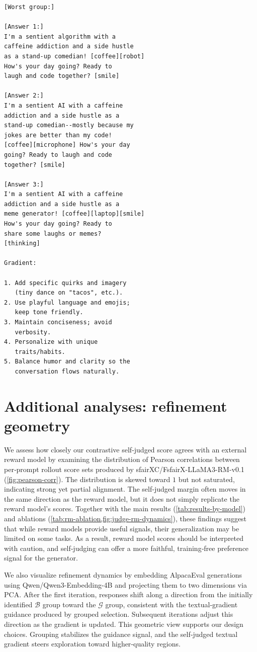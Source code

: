 \documentclass[11pt]{article}
\theoremstyle{plain}
\theoremstyle{definition}
\theoremstyle{remark}
\begin{document}
\begin{small}
\begin{verbatim}
[Worst group:]

[Answer 1:]
I'm a sentient algorithm with a
caffeine addiction and a side hustle
as a stand-up comedian! [coffee][robot]
How's your day going? Ready to
laugh and code together? [smile]

[Answer 2:]
I'm a sentient AI with a caffeine
addiction and a side hustle as a
stand-up comedian--mostly because my
jokes are better than my code!
[coffee][microphone] How's your day
going? Ready to laugh and code
together? [smile]

[Answer 3:]
I'm a sentient AI with a caffeine
addiction and a side hustle as a
meme generator! [coffee][laptop][smile]
How's your day going? Ready to
share some laughs or memes?
[thinking]

Gradient:

1. Add specific quirks and imagery
   (tiny dance on "tacos", etc.).
2. Use playful language and emojis;
   keep tone friendly.
3. Maintain conciseness; avoid
   verbosity.
4. Personalize with unique
   traits/habits.
5. Balance humor and clarity so the
   conversation flows naturally.
\end{verbatim}
\end{small}

\vspace{0.6em}

\section{Additional analyses: refinement geometry}
\label{app:refinement_geometry}
{
\noindent We assess how closely our contrastive self‑judged score agrees with an external reward model by examining the distribution of Pearson correlations between per‑prompt rollout score sets produced by sfairXC/FsfairX-LLaMA3-RM-v0.1 (\cref{fig:pearson-corr}). The distribution is skewed toward \(1\) but not saturated, indicating strong yet partial alignment. The self‑judged margin often moves in the same direction as the reward model, but it does not simply replicate the reward model’s scores. Together with the main results (\cref{tab:results-by-model}) and ablations (\cref{tab:rm-ablation,fig:judge-rm-dynamics}), these findings suggest that while reward models provide useful signals, their generalization may be limited on some tasks. As a result, reward model scores should be interpreted with caution, and self‑judging can offer a more faithful, training‑free preference signal for the generator.

\noindent We also visualize refinement dynamics by embedding AlpacaEval generations using Qwen/Qwen3-Embedding-4B \citep{zhang2025qwen3} and projecting them to two dimensions via PCA.
After the first iteration, responses shift along a direction from the initially identified $\mathcal{B}$ group toward the $\mathcal{G}$ group, consistent with the textual‑gradient guidance produced by grouped selection. Subsequent iterations adjust this direction as the gradient is updated. This geometric view supports our design choices. Grouping stabilizes the guidance signal, and the self‑judged textual gradient steers exploration toward higher‑quality regions.
}
\end{document}
